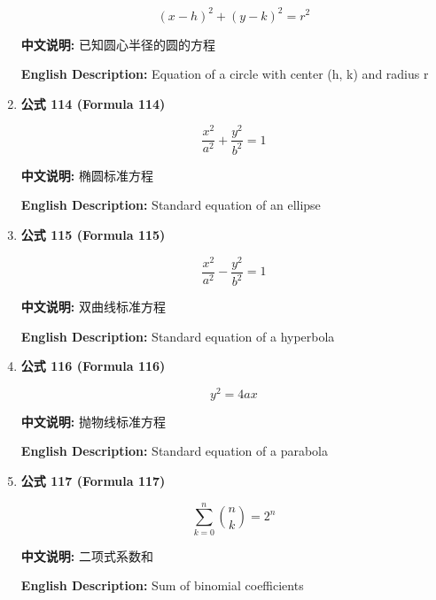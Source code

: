\documentclass[12pt,a4paper]{article}
\begin{document}
\begin{enumerate}[leftmargin=*]
\begin{equation}
(x-h)^2 + (y-k)^2 = r^2
\end{equation}

\textbf{中文说明:} 已知圆心半径的圆的方程

\textbf{English Description:} Equation of a circle with center (h, k) and radius r

\vspace{0.5cm}

\item \textbf{公式 114 (Formula 114)}

\begin{equation}
\frac{x^2}{a^2} + \frac{y^2}{b^2} = 1
\end{equation}

\textbf{中文说明:} 椭圆标准方程

\textbf{English Description:} Standard equation of an ellipse

\vspace{0.5cm}

\item \textbf{公式 115 (Formula 115)}

\begin{equation}
\frac{x^2}{a^2} - \frac{y^2}{b^2} = 1
\end{equation}

\textbf{中文说明:} 双曲线标准方程

\textbf{English Description:} Standard equation of a hyperbola

\vspace{0.5cm}

\item \textbf{公式 116 (Formula 116)}

\begin{equation}
y^2 = 4ax
\end{equation}

\textbf{中文说明:} 抛物线标准方程

\textbf{English Description:} Standard equation of a parabola

\vspace{0.5cm}

\item \textbf{公式 117 (Formula 117)}

\begin{equation}
\sum_{k=0}^n \binom{n}{k} = 2^n
\end{equation}

\textbf{中文说明:} 二项式系数和

\textbf{English Description:} Sum of binomial coefficients


\end{enumerate}
\end{document}
